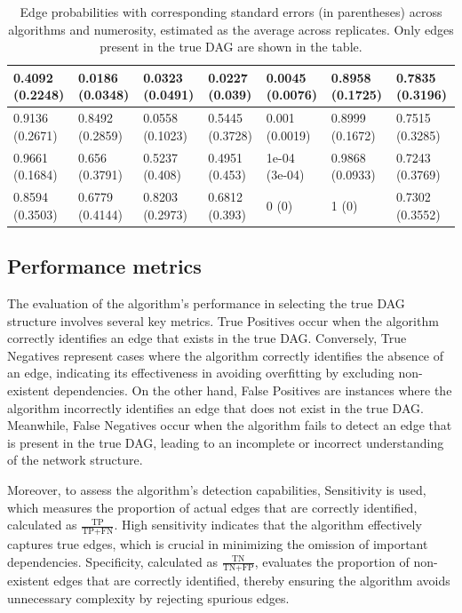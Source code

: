 \documentclass{report}
\begin{document}
\begin{table}[!ht]
\begin{tabular}{|l|l|l|l|l|l|l|}
		\rowcolor{green!8} 0.4092 (0.2248) & 0.0186 (0.0348) & 0.0323 (0.0491) & 0.0227 (0.039) & 0.0045 (0.0076) & 0.8958 (0.1725) & 0.7835 (0.3196) \\ \hline
		\rowcolor{green!8}0.9136 (0.2671) & 0.8492 (0.2859) & 0.0558 (0.1023) & 0.5445 (0.3728) & 0.001 (0.0019) & 0.8999 (0.1672) & 0.7515 (0.3285) \\ \hline
		\rowcolor{green!8} 0.9661 (0.1684) & 0.656 (0.3791) & 0.5237 (0.408) & 0.4951 (0.453) & 1e-04 (3e-04) & 0.9868 (0.0933) & 0.7243 (0.3769) \\ \hline
		\rowcolor{green!8} 0.8594 (0.3503) & 0.6779 (0.4144) & 0.8203 (0.2973) & 0.6812 (0.393) & 0 (0) & 1 (0) & 0.7302 (0.3552) \\ \hline
	\end{tabular}
	\caption{Edge probabilities with corresponding standard errors (in parentheses) across algorithms and numerosity, estimated as the average across replicates. Only edges present in the true DAG are shown in the table.}
	\label{table:edge-probs}
\end{table}

\subsection{Performance metrics}

The evaluation of the algorithm’s performance in selecting the true DAG structure involves several key metrics. True Positives occur when the algorithm correctly identifies an edge that exists in the true DAG. Conversely, True Negatives represent cases where the algorithm correctly identifies the absence of an edge, indicating its effectiveness in avoiding overfitting by excluding non-existent dependencies. On the other hand, False Positives are instances where the algorithm incorrectly identifies an edge that does not exist in the true DAG. Meanwhile, False Negatives occur when the algorithm fails to detect an edge that is present in the true DAG, leading to an incomplete or incorrect understanding of the network structure.

Moreover, to assess the algorithm’s detection capabilities, Sensitivity is used, which measures the proportion of actual edges that are correctly identified, calculated as $\frac{\text{TP}}{\text{TP} + \text{FN}}$. High sensitivity indicates that the algorithm effectively captures true edges, which is crucial in minimizing the omission of important dependencies. Specificity, calculated as $\frac{\text{TN}}{\text{TN} + \text{FP}}$, evaluates the proportion of non-existent edges that are correctly identified, thereby ensuring the algorithm avoids unnecessary complexity by rejecting spurious edges.
\end{document}
